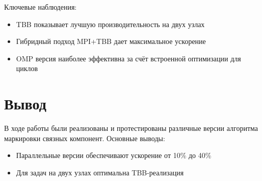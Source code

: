 \documentclass[a4paper,14pt]{article}
\begin{document}
Ключевые наблюдения:
\begin{itemize}
    \item TBB показывает лучшую производительность на двух узлах
    \item Гибридный подход MPI+TBB дает максимальное ускорение
    \item OMP версия наиболее эффективна за счёт встроенной оптимизации для циклов
\end{itemize}

\section{Вывод}
В ходе работы были реализованы и протестированы различные версии алгоритма маркировки связных компонент. Основные выводы:

\begin{itemize}
    \item Параллельные версии обеспечивают ускорение от 10\% до 40\%
    \item Для задач на двух узлах оптимальна TBB-реализация
\end{itemize}
\end{document}
